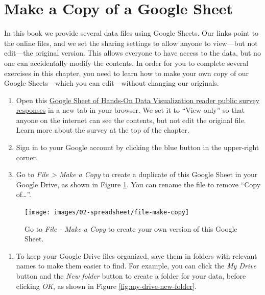 \documentclass[
  english,
]{book}
\providecommand{\tightlist}{%
  \setlength{\itemsep}{0pt}\setlength{\parskip}{0pt}}
\begin{document}
\hypertarget{copy}{%
\section*{Make a Copy of a Google Sheet}\label{copy}}

In this book we provide several data files using Google Sheets. Our links point to the online files, and we set the sharing settings to allow anyone to view---but not edit---the original version. This allows everyone to have access to the data, but no one can accidentally modify the contents. In order for you to complete several exercises in this chapter, you need to learn how to make your own copy of our Google Sheets---which you can edit---without changing our originals.

\begin{enumerate}
\def\labelenumi{\arabic{enumi}.}
\item
  Open this \href{https://docs.google.com/spreadsheets/d/1egX_akJccnCSzdk1aaDdtrEGe5HcaTrlOW-Yf6mJ3Uo}{Google Sheet of Hands-On Data Visualization reader public survey responses} in a new tab in your browser. We set it to ``View only'' so that anyone on the internet can see the contents, but not edit the original file. Learn more about the survey at the top of the chapter.
\item
  Sign in to your Google account by clicking the blue button in the upper-right corner.
\item
  Go to \emph{File \textgreater{} Make a Copy} to create a duplicate of this Google Sheet in your Google Drive, as shown in Figure \ref{fig:file-make-copy}. You can rename the file to remove ``Copy of\ldots{}''.
\end{enumerate}



\begin{figure}
\texttt{[image: images/02-spreadsheet/file-make-copy]} \caption{Go to \emph{File - Make a Copy} to create your own version of this Google Sheet.}\label{fig:file-make-copy}
\end{figure}

\begin{enumerate}
\def\labelenumi{\arabic{enumi}.}
\setcounter{enumi}{3}
\tightlist
\item
  To keep your Google Drive files organized, save them in folders with relevant names to make them easier to find. For example, you can click the \emph{My Drive} button and the \emph{New folder} button to create a folder for your data, before clicking \emph{OK}, as shown in Figure \ref{fig:my-drive-new-folder}.
\end{enumerate}
\end{document}
